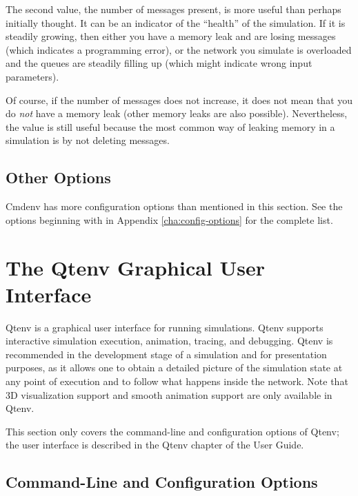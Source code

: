 The second value, the number of messages present, is more useful than
perhaps initially thought. It can be an indicator of the ``health'' of the simulation.
If it is steadily growing, then either you have a memory leak and are losing
messages (which indicates a programming error), or the network you simulate is
overloaded and the queues are steadily filling up (which might indicate wrong input
parameters).

Of course, if the number of messages does not increase, it does not mean
that you do \textit{not} have a memory leak (other memory leaks are also
possible). Nevertheless, the value is still useful because the most
common way of leaking memory in a simulation is by not deleting messages.

\subsection{Other Options}
\label{sec:run-sim:cmdenv:other-options}

Cmdenv has more configuration options than mentioned in this section. See
the options beginning with  in Appendix \ref{cha:config-options}
for the complete list.


\section{The Qtenv Graphical User Interface}
\label{sec:run-sim:qtenv}

Qtenv is a graphical user interface for running simulations. Qtenv
supports interactive simulation execution, animation, tracing, and debugging.
Qtenv is recommended in the development stage of a simulation and for
presentation purposes, as it allows one to obtain a detailed picture of the
simulation state at any point of execution and to follow what happens inside the
network. Note that 3D visualization support and smooth animation support are
only available in Qtenv.

\begin{note}
This section only covers the command-line and configuration options of Qtenv;
the user interface is described in the Qtenv chapter of the {\opp} User Guide.
\end{note}

\subsection{Command-Line and Configuration Options}
\label{sec:run-sim:qtenv-options}

